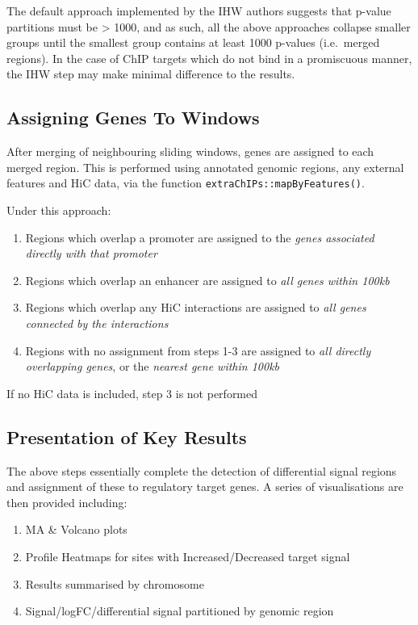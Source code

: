 \documentclass[
]{book}
\providecommand{\tightlist}{%
  \setlength{\itemsep}{0pt}\setlength{\parskip}{0pt}}
\begin{document}
The default approach implemented by the IHW authors suggests that p-value partitions must be \textgreater{} 1000, and as such, all the above approaches collapse smaller groups until the smallest group contains at least 1000 p-values (i.e.~merged regions).
In the case of ChIP targets which do not bind in a promiscuous manner, the IHW step may make minimal difference to the results.

\hypertarget{assigning-genes-to-windows}{%
\subsection*{Assigning Genes To Windows}\label{assigning-genes-to-windows}}

After merging of neighbouring sliding windows, genes are assigned to each merged region.
This is performed using annotated genomic regions, any external features and HiC data, via the function \texttt{extraChIPs::mapByFeatures()}.

Under this approach:

\begin{enumerate}
\def\labelenumi{\arabic{enumi}.}
\tightlist
\item
  Regions which overlap a promoter are assigned to the \emph{genes associated directly with that promoter}
\item
  Regions which overlap an enhancer are assigned to \emph{all genes within 100kb}
\item
  Regions which overlap any HiC interactions are assigned to \emph{all genes connected by the interactions}
\item
  Regions with no assignment from steps 1-3 are assigned to \emph{all directly overlapping genes}, or the \emph{nearest gene within 100kb}
\end{enumerate}

If no HiC data is included, step 3 is not performed

\hypertarget{presentation-of-key-results}{%
\subsection*{Presentation of Key Results}\label{presentation-of-key-results}}

The above steps essentially complete the detection of differential signal regions and assignment of these to regulatory target genes.
A series of visualisations are then provided including:

\begin{enumerate}
\def\labelenumi{\arabic{enumi}.}
\tightlist
\item
  MA \& Volcano plots
\item
  Profile Heatmaps for sites with Increased/Decreased target signal
\item
  Results summarised by chromosome
\item
  Signal/logFC/differential signal partitioned by genomic region
\end{enumerate}
\end{document}
